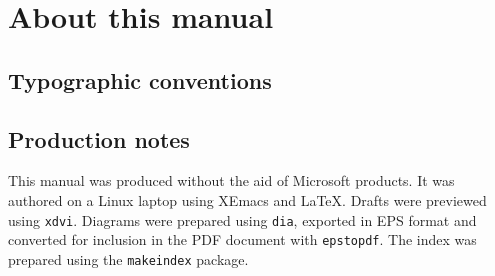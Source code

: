 \chapter{About this manual}

\section{Typographic conventions}

\section{Production notes}

This manual was produced without the aid of Microsoft products.
It was authored on a Linux laptop using XEmacs and
\LaTeX{}.  Drafts were previewed using
\texttt{xdvi}. Diagrams were prepared using \texttt{dia}, exported
in EPS format and converted for inclusion in the PDF document with \texttt{epstopdf}.  
The index was prepared using the \texttt{makeindex} package.

